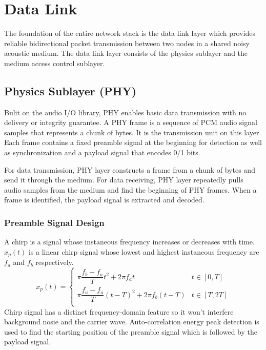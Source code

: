 \section{Data Link}
The foundation of the entire network stack is the data link layer which
provides reliable bidirectional packet transmission between two nodes in a shared noisy acoustic medium.
The data link layer consists of the physics sublayer and the medium access control sublayer.

\subsection{Physics Sublayer (PHY)}
Bulit on the audio I/O library, PHY enables basic data transmission with no delivery or integrity guarantee.
A PHY frame is a sequence of PCM audio signal samples that represents a chunk of bytes. It is the transmission unit on this layer.
Each frame contains a fixed preamble signal at the beginning for detection as well as synchronization and a payload signal that encodes 0/1 bits.\par
For data transmission, PHY layer constructs a frame from a chunk of bytes and send it through the medium.
For data receiving, PHY layer repeatedly pulls audio samples from the medium and find the beginning of PHY frames.
When a frame is identified, the payload signal is extracted and decoded.
\subsubsection{Preamble Signal Design}
A chirp is a signal whose instaneous frequency increases or decreases with time.
$x_p(t)$ is a linear chirp signal whose lowest and highest instaneous frequency are $f_a$ and $f_b$ respectively.
\[
	x_p(t) = \begin{cases}
		\pi \dfrac{f_b-f_a}{T} t^2       + 2\pi f_a t     & t\in [0,T]  \\
		\pi \dfrac{f_a-f_a}{T} {(t-T)}^2 + 2\pi f_b (t-T) & t\in [T,2T] \\
	\end{cases}
\]
Chirp signal has a distinct frequency-domain feature so it won't interfere background nosie and the carrier wave.
Auto-correlation energy peak detection is used to find the starting position of the preamble signal which is followed by the payload signal.


